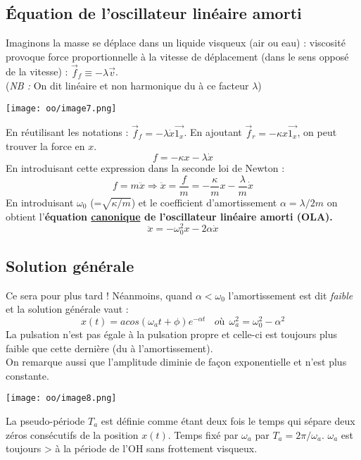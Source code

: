 \documentclass[british,french,11pt, a4paper, openany]{book}
\begin{document}
	\subsection{Équation de l'oscillateur linéaire amorti}
	Imaginons la masse se déplace dans un liquide visqueux (air ou eau) : viscosité provoque force proportionnelle à la vitesse de déplacement (dans le sens opposé de la vitesse) : $\vec{f}_f \equiv -\lambda\vec{v}$.\\
	(\textit{NB :} On dit linéaire et non harmonique du à ce facteur $\lambda$)
	\begin{center}
		\texttt{[image: oo/image7.png]}
	\end{center}
	En réutilisant les notations : $\vec{f}_f = -\lambda\dot{x}\vec{1_x}$. En ajoutant $\vec{f}_r = -\kappa x \vec{1_x}$, on peut trouver la force en $x$.
	\begin{equation}
		f = -\kappa x - \lambda \dot{x}
	\end{equation}
	En introduisant cette expression dans la seconde loi de Newton : 
	\begin{equation}
		f = m\ddot{x} \Rightarrow \ddot{x} = \frac{f}{m} = -\frac{\kappa}{m}x - \frac{\lambda}{m}\dot{x}
	\end{equation}
	En introduisant $\omega_0$ (=$\sqrt{\kappa/m}$) et le coefficient d'amortissement $\alpha = \lambda/2m$ on obtient l'\textbf{équation \underline{canonique} de l'oscillateur linéaire amorti (OLA).}
	\begin{equation}
		\ddot{x} = - \omega_0^2x - 2\alpha\dot{x}
	\end{equation}
	
	\subsection{Solution générale}
	Ce sera pour plus tard ! Néanmoins, quand $\alpha < \omega_0$ l'amortissement est dit \textit{faible} et la solution générale vaut : 
	\begin{equation}
		x(t) = a cos(\omega_a t + \phi) e^{-\alpha t}\ \ \ \ où\ \ \omega_a^2 = \omega_0^2 - \alpha^2
	\end{equation}
	La pulsation n'est pas égale à la pulsation propre et celle-ci est toujours plus faible que cette dernière (du à l'amortissement).\\
	On remarque aussi que l'amplitude diminie de façon exponentielle et n'est plus constante.
	
	\begin{center}
		\texttt{[image: oo/image8.png]}
	\end{center}
	La pseudo-période $T_a$ est définie comme étant deux fois le temps qui sépare deux zéros consécutifs de la position $x(t)$. Temps fixé par $\omega_a$ par $T_a = 2\pi/\omega_a$. $\omega_a$ est toujours > à la période de l'OH sans frottement visqueux.
	
\end{document}
